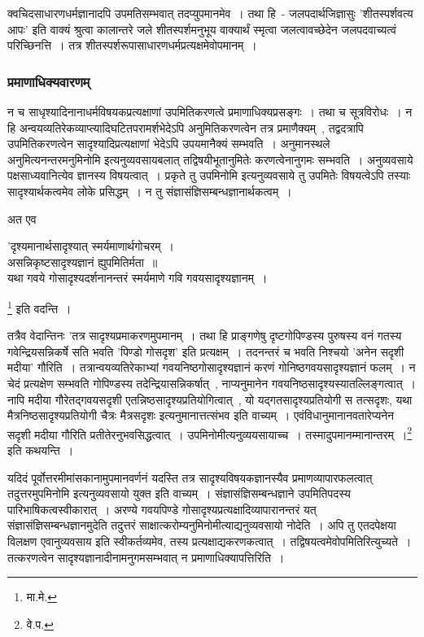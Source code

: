 		क्वचिदसाधारणधर्मज्ञानादपि उपमतिसम्भवात् तदप्युपमानमेव~। तथा हि~- जलपदार्थजिज्ञासुः 'शीतस्पर्शवत्य आपः' इति वाक्यं श्रुत्वा कालान्तरे जले शीतस्पर्शमनुभूय वाक्यार्थं स्मृत्वा जलत्वावच्छेदेन जलपदवाच्यत्वं परिच्छिनत्ति~। तत्र शीतस्पर्शरूपासाधारणधर्मप्रत्यक्षमेवोपमानम्~।

		\subsubsection{प्रमाणाधिक्यवारणम्}

		न च साधृश्यादिनानाधर्मविषयकप्रत्यक्षाणां उपमितिकरणत्वे प्रमाणाधिक्यप्रसङ्गः~। तथा च सूत्रविरोधः~। न हि अन्वयव्यतिरेकव्याप्त्यादिघटितपरामर्शभेदेऽपि अनुमितिकरणत्वेन तत्र प्रमाणैक्यम्~, तद्वदत्रापि उपमितिकरणत्वेन सादृश्यादिप्रत्यक्षाणां भेदेऽपि उपयमानैक्यं सम्भवति~। अनुमानस्थले अनुमित्यनन्तरमनुमिनोमि इत्यनुव्यवसायबलात् तद्विषयीभूतानुमितेः करणत्वेनानुगमः सम्भवति~। अनुव्यवसाये पक्षसाध्यवानित्येव ज्ञानस्य विषयत्वात्~। प्रकृते तु उपमिनोमि इत्यनुव्यवसाये तु उपमितेः विषयत्वेऽपि तस्याः सादृश्यार्थकत्वमेव लोके प्रसिद्धम्~। न तु संज्ञासंज्ञिसम्बन्धज्ञानार्थकत्वम्~। 
		
		अत एव {\fontsize{11.7}{0}\selectfont\s \begin{center}'दृश्यमानार्थसादृश्यात् स्मर्यमाणार्थगोचरम्~।\\ असन्निकृष्टसादृश्यज्ञानं ह्युपमितिर्मता~॥\\ यथा गवये गोसादृश्यदर्शनानन्तरं स्मर्यमाणे गवि गवयसादृश्यज्ञानम्~।\end{center}}\footnote{मा.मे.} इति वदन्ति~। 
		
		तत्रैव वेदान्तिनः {\fontsize{11.7}{0}\selectfont\s 'तत्र सादृश्यप्रमाकरणमुपमानम्~। तथा हि प्राङ्गणेषु दृष्टगोपिण्डस्य पुरुषस्य वनं गतस्य गवेन्द्रियसन्निकर्षे सति भवति 'पिण्डो गोसदृश' इति प्रत्यक्षम्~। तदनन्तरं च भवति निश्चयो 'अनेन सदृशी मदीया' गौरिति~। तत्रान्वयव्यतिरेकाभ्यां गवयनिष्ठगोसादृश्यज्ञानं करणं गोनिष्ठगवयसादृश्यज्ञानं फलम्~। न चेदं प्रत्यक्षेण सम्भवति गोपिण्डस्य तदेन्द्रियासन्निकर्षात्~, नाप्यनुमानेन गवयनिष्ठसादृश्यस्यातल्लिङ्गत्वात्~।नापि मदीया गौरेतद्गवयसदृशी एतन्निष्ठसादृश्यप्रतियोगित्वात्~, यो यद्गतसादृश्यप्रतियोगी स तत्सदृशः, यथा मैत्रनिष्ठसादृश्यप्रतियोगी चैत्रः मैत्रसदृशः इत्यनुमानात्तत्संभव इति वाच्यम्~। एवंविधानुमानानवतारेप्यनेन सदृशी मदीया गौरिति प्रतीतेरनुभवसिद्धत्वात्~। उपमिनोमीत्यनुव्ययसायाच्च~। तस्मादुपमानम्मानान्तरम्~।}\footnote{वे.प.} इति कथयन्ति~।
		
		यदिदं पूर्वोत्तरमीमांसकानामुपमानवर्णनं यदस्ति तत्र सादृश्यविषयकज्ञानस्यैव प्रमाणव्यापारफलत्वात् तदुत्तरमुपमिनोमि इत्यनुव्यवसायो युक्त इति वाच्यम्~। संज्ञासंज्ञिसम्बन्धज्ञाने उपमितिपदस्य पारिभाषिकत्वस्वीकारात्~। अरण्ये गवयपिण्डे गोसादृश्यप्रत्यक्षादिव्यापारानन्तरं यत् संज्ञासंज्ञिसम्बन्धज्ञानमुदेति तदुत्तरं साक्षात्करोम्यनुमिनोमीत्याद्यनुव्यवसायो नोदेति~। अपि तु एतदपेक्षया विलक्षण एवानुव्यवसाय इति स्वीकर्तव्यमेव, तस्य प्रत्यक्षाद्यकरणकत्वात्~। तद्विषयत्वमेवोपमितिरित्युच्यते~। तत्करणत्वेन सादृश्यज्ञानादीनामनुगमसम्भवात् न प्रमाणाधिक्यापत्तिरिति~।

